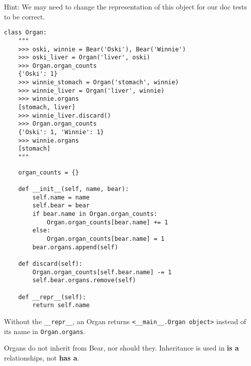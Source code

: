 \begin{parts}
\begin{blocksection}
Hint: We may need to change the representation of this object for our doc tests to be correct.


\begin{lstlisting}
class Organ:
    """
    >>> oski, winnie = Bear('Oski'), Bear('Winnie')
    >>> oski_liver = Organ('liver', oski)
    >>> Organ.organ_counts
    {'Oski': 1}
    >>> winnie_stomach = Organ('stomach', winnie)
    >>> winnie_liver = Organ('liver', winnie)
    >>> winnie.organs
    [stomach, liver]
    >>> winnie_liver.discard()
    >>> Organ.organ_counts
    {'Oski': 1, 'Winnie': 1}
    >>> winnie.organs
    [stomach]
    """
\end{lstlisting}

\begin{solution}[4 in]
\begin{lstlisting}
    organ_counts = {}

    def __init__(self, name, bear):
        self.name = name
        self.bear = bear
        if bear.name in Organ.organ_counts:
            Organ.organ_counts[bear.name] += 1
        else:
            Organ.organ_counts[bear.name] = 1
        bear.organs.append(self)

    def discard(self):
        Organ.organ_counts[self.bear.name] -= 1
        self.bear.organs.remove(self)

    def __repr__(self):
        return self.name
\end{lstlisting}

Without the \lstinline{__repr__}, an Organ returns \lstinline{<__main__.Organ object>} instead of its name in \lstinline{Organ.organs}.

Organs do not inherit from Bear, nor should they. Inheritance is used in \textbf{is a} relationships, not \textbf{has a}.
\end{solution}
\end{blocksection}


\end{parts}
